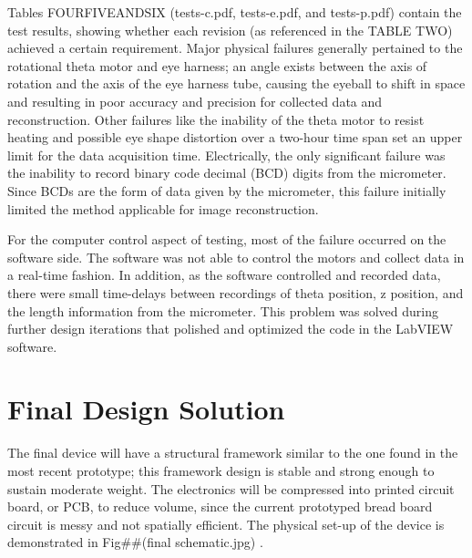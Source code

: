 \documentclass{article}
\begin{document}
Tables FOURFIVEANDSIX (tests-c.pdf, tests-e.pdf, and tests-p.pdf) contain the test results, showing whether each revision (as referenced in the TABLE TWO) achieved a certain requirement. Major physical failures generally pertained to the rotational theta motor and eye harness; an angle exists between the axis of rotation and the axis of the eye harness tube, causing the eyeball to shift in space and resulting in poor accuracy and precision for collected data and reconstruction. Other failures like the inability of the theta motor to resist heating and possible eye shape distortion over a two-hour time span set an upper limit for the data acquisition time. Electrically, the only significant failure was the inability to record binary code decimal (BCD) digits from the micrometer. Since BCDs are the form of data given by the micrometer, this failure initially limited the method applicable for image reconstruction. 

	For the computer  control aspect of testing, most of the failure occurred on the software side. The software was not able to control the motors and collect data in a real-time fashion. In addition, as the software controlled and recorded data, there were small time-delays between recordings of theta position, z position, and the length information from the micrometer.  This problem was solved during further design iterations that polished and optimized the code in the LabVIEW software. 

\section{Final Design Solution}
\label{sec:final-design-solut}

The final device will have a structural framework similar to the one found in the most recent prototype; this framework design is stable and strong enough to sustain moderate weight. The electronics will be compressed into printed circuit board, or PCB, to reduce volume, since the current prototyped bread board circuit is messy and not spatially efficient. The physical set-up of the device is demonstrated in Fig##(final schematic.jpg) .
\end{document}
